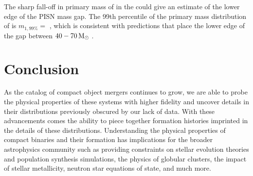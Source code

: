 The sharp fall-off in primary mass of \contA{} in the \comp{} could give an estimate of the lower edge of the PISN mass gap. The 99th percentile of the primary mass distribution of \contA{} is $m_{1,99\%} = $ \result{$\CIPlusMinus{\macros[Mass][Composite][ContinuumA][99percentile]}$ \msun}, which is consistent with predictions that place the lower edge of the gap between $40-70{\,\rm M}_\odot$ \citep{1901.00215,1910.12874v1,2103.07933v1,2104.07783v2}.


\section{Conclusion} \label{sec:conclusion}


As the catalog of compact object mergers continues to grow, we are able to probe the physical properties of these systems with higher fidelity and uncover details in their distributions previously obscured by our lack of data. With these advancements comes the ability to piece together formation histories imprinted in the details of these distributions. Understanding the physical properties of compact binaries and their formation has implications for the broader astrophysics community such as providing constraints on stellar evolution theories and population synthesis simulations, the physics of globular clusters, the impact of stellar metallicity, neutron star equations of state, and much more.


